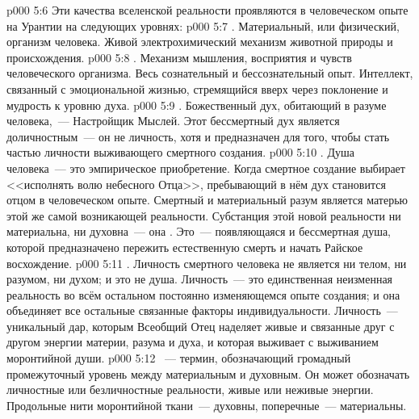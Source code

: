 \vs p000 5:6 \pc Эти качества вселенской реальности проявляются в человеческом опыте на Урантии на следующих уровнях:
\vs p000 5:7 . Материальный, или физический, организм человека. Живой электрохимический механизм животной природы и происхождения.
\vs p000 5:8 . Механизм мышления, восприятия и чувств человеческого организма. Весь сознательный и бессознательный опыт. Интеллект, связанный с эмоциональной жизнью, стремящийся вверх через поклонение и мудрость к уровню духа.
\vs p000 5:9 . Божественный дух, обитающий в разуме человека,~--- Настройщик Мыслей. Этот бессмертный дух является доличностным~--- он не личность, хотя и предназначен для того, чтобы стать частью личности выживающего смертного создания.
\vs p000 5:10 . Душа человека~--- это эмпирическое приобретение. Когда смертное создание выбирает <<исполнять волю небесного Отца>>, пребывающий в нём дух становится отцом  в человеческом опыте. Смертный и материальный разум является матерью этой же самой возникающей реальности. Субстанция этой новой реальности ни материальна, ни духовна~--- она . Это~--- появляющаяся и бессмертная душа, которой предназначено пережить естественную смерть и начать Райское восхождение.
\vs p000 5:11 \pc {}. Личность смертного человека не является ни телом, ни разумом, ни духом; и это не душа. Личность~--- это единственная неизменная реальность во всём остальном постоянно изменяющемся опыте создания; и она объединяет все остальные связанные факторы индивидуальности. Личность~--- уникальный дар, которым Всеобщий Отец наделяет живые и связанные друг с другом энергии материи, разума и духа, и которая выживает с выживанием моронтийной души.
\vs p000 5:12 \pc {}~--- термин, обозначающий громадный промежуточный уровень между материальным и духовным. Он может обозначать личностные или безличностные реальности, живые или неживые энергии. Продольные нити моронтийной ткани~--- духовны, поперечные~--- материальны.
